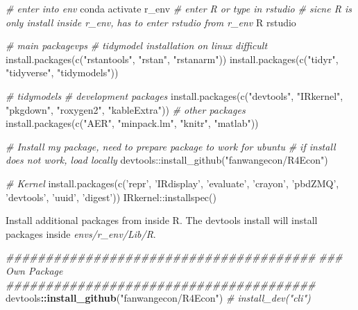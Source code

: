 \documentclass[]{article}
\newenvironment{Shaded}{\begin{snugshade}}{\end{snugshade}}
\newcommand{\CommentTok}[1]{\textcolor[rgb]{0.56,0.35,0.01}{\textit{#1}}}
\newcommand{\ExtensionTok}[1]{#1}
\newcommand{\FunctionTok}[1]{\textcolor[rgb]{0.00,0.00,0.00}{#1}}
\newcommand{\KeywordTok}[1]{\textcolor[rgb]{0.13,0.29,0.53}{\textbf{#1}}}
\newcommand{\NormalTok}[1]{#1}
\newcommand{\OperatorTok}[1]{\textcolor[rgb]{0.81,0.36,0.00}{\textbf{#1}}}
\newcommand{\StringTok}[1]{\textcolor[rgb]{0.31,0.60,0.02}{#1}}
\begin{document}
\begin{Shaded}
\begin{Highlighting}[]
\CommentTok{# enter into env}
\ExtensionTok{conda}\NormalTok{ activate r_env}
\CommentTok{# enter R or type in rstudio}
\CommentTok{# sicne R is only install inside r_env, has to enter rstudio from r_env}
\ExtensionTok{R}
\ExtensionTok{rstudio}

\CommentTok{# main packagevps}
\CommentTok{# tidymodel installation on linux difficult}
\ExtensionTok{install.packages}\NormalTok{(c(}\StringTok{"rstantools"}\NormalTok{, }\StringTok{"rstan"}\NormalTok{, }\StringTok{"rstanarm"}\NormalTok{))}
\ExtensionTok{install.packages}\NormalTok{(c(}\StringTok{"tidyr"}\NormalTok{, }\StringTok{"tidyverse"}\NormalTok{, }\StringTok{"tidymodels"}\NormalTok{))}

\CommentTok{# tidymodels}
\CommentTok{# development packages}
\ExtensionTok{install.packages}\NormalTok{(c(}\StringTok{"devtools"}\NormalTok{, }\StringTok{"IRkernel"}\NormalTok{, }\StringTok{"pkgdown"}\NormalTok{, }\StringTok{"roxygen2"}\NormalTok{, }\StringTok{"kableExtra"}\NormalTok{))}
\CommentTok{# other packages}
\ExtensionTok{install.packages}\NormalTok{(c(}\StringTok{"AER"}\NormalTok{, }\StringTok{"minpack.lm"}\NormalTok{, }\StringTok{"knitr"}\NormalTok{, }\StringTok{"matlab"}\NormalTok{))}

\CommentTok{# Install my package, need to prepare package to work for ubuntu}
\CommentTok{# if install does not work, load locally}
\ExtensionTok{devtools}\NormalTok{::install_github(}\StringTok{"fanwangecon/R4Econ"}\NormalTok{)}

\CommentTok{# Kernel}
\ExtensionTok{install.packages}\NormalTok{(c(}\StringTok{'repr'}\NormalTok{, }\StringTok{'IRdisplay'}\NormalTok{, }\StringTok{'evaluate'}\NormalTok{, }\StringTok{'crayon'}\NormalTok{, }\StringTok{'pbdZMQ'}\NormalTok{, }\StringTok{'devtools'}\NormalTok{, }\StringTok{'uuid'}\NormalTok{, }\StringTok{'digest'}\NormalTok{))}
\FunctionTok{IRkernel::installspec()}
\end{Highlighting}
\end{Shaded}

Install additional packages from inside R. The devtools install will
install packages inside \emph{envs/r\_env/Lib/R}.

\begin{Shaded}
\begin{Highlighting}[]
\CommentTok{#######################################}
\CommentTok{### Own Package}
\CommentTok{#######################################}
\NormalTok{devtools}\OperatorTok{::}\KeywordTok{install_github}\NormalTok{(}\StringTok{"fanwangecon/R4Econ"}\NormalTok{)}
\CommentTok{# install_dev("cli")}
\end{Highlighting}
\end{Shaded}
\end{document}
